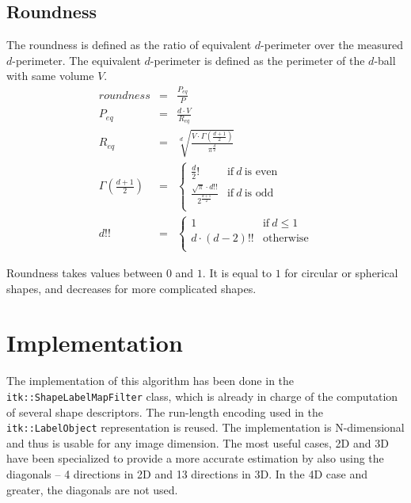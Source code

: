 \documentclass{InsightArticle}
\begin{document}
\subsection{Roundness}

The roundness is defined as the ratio of equivalent $d$-perimeter over the measured $d$-perimeter. 
The equivalent $d$-perimeter is defined as the perimeter of the $d$-ball with same volume $V$.
\begin{eqnarray}
roundness             & = & \frac{P_{eq}}{P} \\
P_{eq}                & = & \frac{d \cdot V}{R_{eq}} \\
R_{eq}                & = & \sqrt[\displaystyle d]{\frac{V\cdot\Gamma(\frac{d+1}{2})}{\pi^\frac{d}{2}}} \\
\Gamma(\frac{d+1}{2}) & = & \begin{cases}
                               \displaystyle \frac{d}{2}!  &\text{if}~ d ~\text{is even} \\
                               \displaystyle \frac{\sqrt{\pi} \cdot d!!}{2^{\frac{d+1}{2}}}  &\text{if}~ d ~\text{is odd} \\
                            \end{cases} \\
d!!                   & = & \begin{cases}
                                1 &\text{if}~ d \leq 1 \\
                                d \cdot (d-2)!!  & \text{otherwise} \\
                             \end{cases}
\end{eqnarray}


Roundness takes values between $0$ and $1$. 
It is equal to $1$ for circular or spherical shapes, 
and decreases for more complicated shapes.


\section{Implementation}

The implementation of this algorithm has been done in the \verb$itk::ShapeLabelMapFilter$ class, which is already in charge of the computation of
several shape descriptors. The run-length encoding used in the \verb$itk::LabelObject$ representation is reused.
The implementation is N-dimensional and thus is usable for any image dimension. The most useful cases, 2D and 3D have been specialized
to provide a more accurate estimation by also using the diagonals -- 4 directions in 2D and 13 directions in 3D. In the 4D case and greater,
the diagonals are not used.
\end{document}
